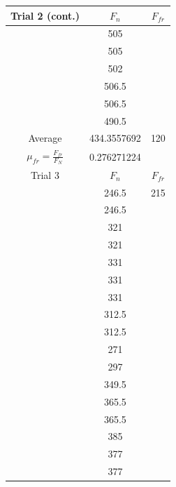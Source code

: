 \documentclass[12pt]{article}
\begin{document}
\pagebreak

\begin{table}
    \footnotesize
    \begin{tabular}[t]{| c  c  c |}
        \hline
        Trial 2 (cont.) & $F_{n}$       & $F_{fr}$  \\
        \hline
                & 505           &           \\
                & 505           &           \\
                & 502           &           \\
                & 506.5         &           \\
                & 506.5         &           \\
                & 490.5         &           \\
        \hline
        Average & 434.3557692   & 120       \\
        \hline
        $\mu_{fr} = \frac{F_{fr}}{F_{N}}$ & 0.276271224 & \\
        \hline
        \hline
        Trial 3 & $F_{n}$       & $F_{fr}$  \\
        \hline
                & 246.5         & 215       \\
                & 246.5         &           \\
                & 321           &           \\
                & 321           &           \\
                & 331           &           \\
                & 331           &           \\
                & 331           &           \\
                & 312.5         &           \\
                & 312.5         &           \\
                & 271           &           \\
                & 297           &           \\
                & 349.5         &           \\
                & 365.5         &           \\
                & 365.5         &           \\
                & 385           &           \\
                & 377           &           \\
                & 377           &           \\

\end{tabular}
\end{table}
\end{document}
